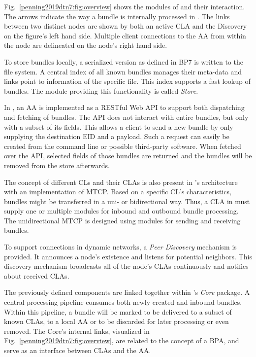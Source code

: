 Fig.~\ref{penning2019dtn7:fig:overview} shows the modules of \dtn and their interaction.
The arrows indicate the way a bundle is internally processed in \dtn. 
The links between two distinct \dtn nodes are shown by both an active CLA and the Discovery on the figure's left hand side. 
Multiple client connections to the AA from within the node are delineated on the node's right hand side.

To store bundles locally, a serialized version as defined in BP7 is written to the file system. 
A central index of all known bundles manages their meta-data and links point to information of the specific file.
This index supports a fast lookup of bundles. The module providing this functionality is called \textit{Store}.

In \dtn, an AA is implemented as a RESTful Web API to support both dispatching and fetching of bundles. 
The API does not interact with entire bundles, but only with a subset of its fields.
This allows a client to send a new bundle by only supplying the destination EID and a payload. 
Such a request can easily be created from the command line or possible third-party software.
When fetched over the API, selected fields of those bundles are returned and the bundles will be removed from the store afterwards.

The concept of different CLs and their CLAs is also present in \dtn's architecture with an implementation of MTCP.
Based on a specific CL's characteristics, bundles might be transferred in a uni- or bidirectional way. Thus, a CLA in \dtn must supply one or multiple modules for inbound and outbound bundle processing.
The unidirectional MTCP is designed using modules for sending and receiving bundles.

To support connections in dynamic networks, a \textit{Peer Discovery} mechanism is provided. It announces a node's existence and listens for potential neighbors.
This discovery mechanism broadcasts all of the node's CLAs continuously and notifies about received CLAs.

The previously defined components are linked together within \dtn's \textit{Core} package. 
A central processing pipeline consumes both newly created and inbound bundles. 
Within this pipeline, a bundle will be marked to be delivered to a subset of known CLAs, to a local AA or to be discarded for later processing or even removed.
The Core's internal links, visualized in Fig.~\ref{penning2019dtn7:fig:overview}, are related to the concept of a BPA, and serve as an interface between CLAs and the AA.

